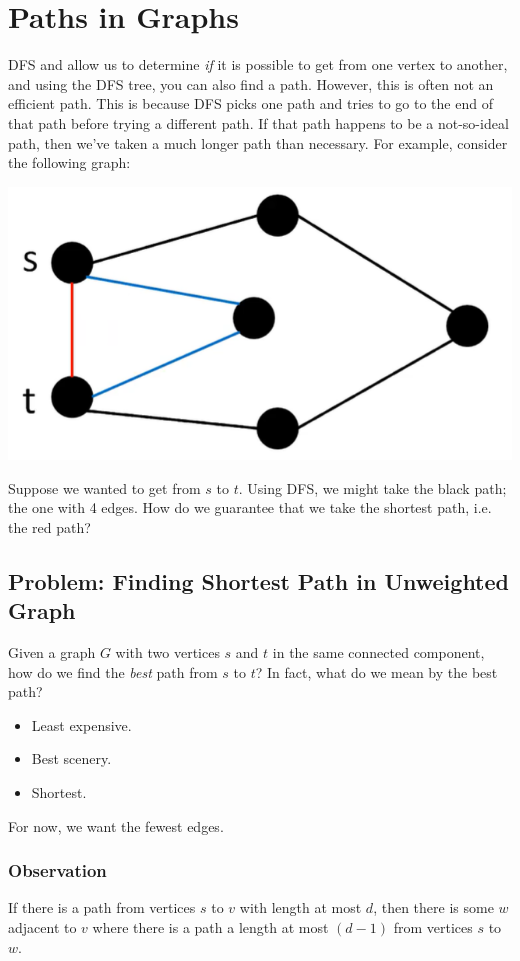 \documentclass[letterpaper]{article}
\begin{document}
\section{Paths in Graphs}
DFS and  allow us to determine \emph{if} it is possible to get from one vertex to another, and using the DFS tree, you can also find a path. However, this is often not an efficient path. This is because DFS picks one path and tries to go to the end of that path before trying a different path. If that path happens to be a not-so-ideal path, then we've taken a much longer path than necessary. For example, consider the following graph:
\begin{center}
    \includegraphics[scale=0.4]{assets/dfs_bfs_comp.png}
\end{center}
Suppose we wanted to get from $s$ to $t$. Using DFS, we might take the black path; the one with 4 edges. How do we guarantee that we take the shortest path, i.e. the red path? 

\subsection{Problem: Finding Shortest Path in Unweighted Graph}
Given a graph $G$ with two vertices $s$ and $t$ in the same connected component, how do we find the \emph{best} path from $s$ to $t$? In fact, what do we mean by the best path? 
\begin{itemize}
    \item Least expensive. 
    \item Best scenery.
    \item Shortest.
\end{itemize}
For now, we want the fewest edges. 

\subsubsection{Observation}
\begin{proposition}
    If there is a path from vertices $s$ to $v$ with length at most $d$, then there is some $w$ adjacent to $v$ where there is a path a length at most $(d - 1)$ from vertices $s$ to $w$.
\end{proposition} 
\end{document}
